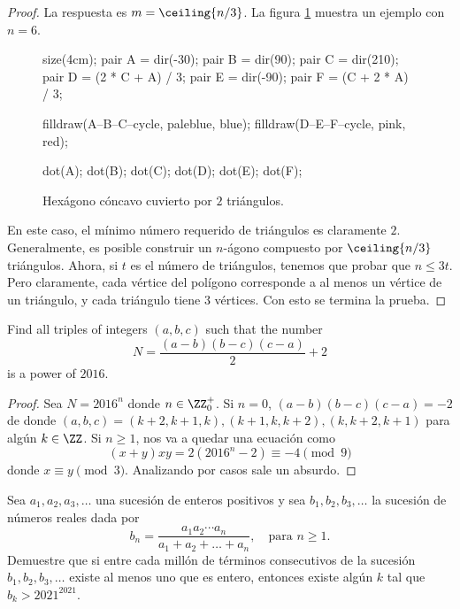 \begin{proof}
	La respuesta es $m=\ceiling{n/3}$. La figura \ref{fig:splitting_hexagon} muestra un ejemplo con $n=6$.

	\begin{figure}[ht!]
		\centering
		\begin{asy}
			size(4cm);
			pair A = dir(-30);
			pair B = dir(90);
			pair C = dir(210);
			pair D = (2 * C + A) / 3;
			pair E = dir(-90);
			pair F = (C + 2 * A) / 3;

			filldraw(A--B--C--cycle, paleblue, blue);
			filldraw(D--E--F--cycle, pink, red);

			dot(A);
			dot(B);
			dot(C);
			dot(D);
			dot(E);
			dot(F);
		\end{asy}
		\caption{Hexágono cóncavo cuvierto por $2$ triángulos.}
		\label{fig:splitting_hexagon}
	\end{figure}

	En este caso, el mínimo número requerido de triángulos es claramente $2$. Generalmente, es posible construir un $n$-ágono compuesto por $\ceiling{n/3}$ triángulos. Ahora, si $t$ es el número de triángulos, tenemos que probar que $n\le 3t$. Pero claramente, cada vértice del polígono corresponde a al menos un vértice de un triángulo, y cada triángulo tiene $3$ vértices. Con esto se termina la prueba.
\end{proof}

\begin{probEB}
	Find all triples of integers $(a,b,c)$ such that the number
	\[N=\frac{(a-b)(b-c)(c-a)}{2}+2\]
	is a power of $2016$.
\end{probEB}

\begin{proof}
	Sea $N=2016^n$ donde $n\in\ZZ^+_0$. Si $n=0$, $(a-b)(b-c)(c-a)=-2$ de donde $(a,b,c)=(k+2,k+1,k),(k+1,k,k+2),(k,k+2,k+1)$ para algún $k\in\ZZ$. Si $n\ge 1$, nos va a quedar una ecuación como
	\[(x+y)xy=2(2016^n-2)\equiv -4\pmod 9\]
	donde $x\equiv y\pmod 3$. Analizando por casos sale un absurdo.
\end{proof}

\begin{probMB}[IberoAmerican 2021/3]
	Sea $a_1,a_2,a_3,\dots$ una sucesión de enteros positivos y sea $b_1,b_2,b_3,\dots$ la sucesión de números reales dada por
	\[b_n=\frac{a_1a_2\cdots a_n}{a_1+a_2+\dots+a_n},\quad\text{para }n\ge 1.\]
	Demuestre que si entre cada millón de términos consecutivos de la sucesión $b_1,b_2,b_3,\dots$ existe al menos uno que es entero, entonces existe algún $k$ tal que $b_k>2021^{2021}$.
\end{probMB}

